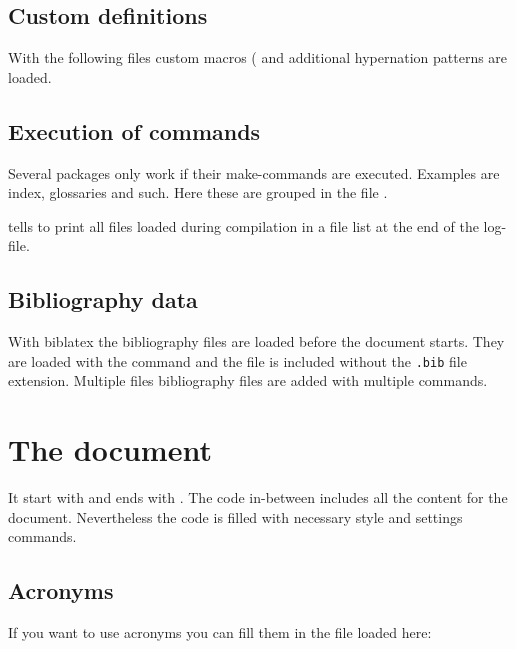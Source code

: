\subsection{Custom definitions}
With the following files custom macros ( and additional hypernation patterns  are loaded. 

\subsection{Execution of commands}
Several packages only work if their make-commands are executed. Examples are index, glossaries and such. Here these are grouped in the file . 

 tells \latex to print all files loaded during compilation in a file list at the end of the log-file.
%

\subsection{Bibliography data}
With biblatex the bibliography files are loaded before the document starts. 
They are loaded with the command  and the file is included without the \texttt{.bib} file extension. Multiple files bibliography files are added with multiple  commands.

\section{The document}
It start with  and ends with .
The code in-between includes all the content for the document. Nevertheless the code is filled with necessary style and settings commands.

\subsection{Acronyms}
If you want to use acronyms you can fill them in the file loaded here:
%
